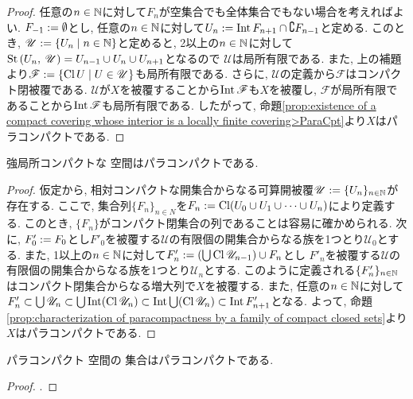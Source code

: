 \documentclass[uplatex, dvipdfmx, a4paper, 12pt, class=jsbook, crop=false]{standalone}
\begin{document}
\begin{proof}
	任意の$ n \in \mathbb{N} $に対して$ F_n $が空集合でも全体集合でもない場合を考えればよい.
	$ F_{-1} \mathrel{:=} \emptyset $とし, 任意の$ n \in \mathbb{N} $に対して$ U_n \mathrel{:=} \mathop{\mathrm{Int}}\nolimits F_{n+1} \cap \complement F_{n-1} $と定める.
	このとき, $ \mathscr{U} \defeq \setcomp{U_n}{n \in \N} $と定めると,
	2以上の$ n \in \mathbb{N} $に対して$ \mathrm{St}\left(U_n , \: \mathscr{U}\right) = U_{n-1} \cup U_n \cup U_{n+1} $となるので
	$ \mathscr{U} $は局所有限である. また, 上の補題より$ \mathscr{F} \defeq \setcomp{\topcl U}{U \in \mathscr{U}} $も局所有限である.
	さらに, $ \mathscr{U} $の定義から$ \mathscr{F} $はコンパクト閉被覆である.
	$ \mathscr{U} $が$ X $を被覆することから$ \mathop{\mathrm{Int}}\nolimits \mathscr{F} $も$ X $を被覆し,
	$ \mathscr{F} $が局所有限であることから$ \mathop{\mathrm{Int}}\nolimits \mathscr{F} $も局所有限である.
	したがって, 命題\ref{prop:existence of a compact covering whose interior is a locally finite covering>ParaCpt}より$ X $はパラコンパクトである.
\end{proof}

\begin{proposition}
	強局所コンパクトな \Lindelof 空間はパラコンパクトである.
\end{proposition}

\begin{proof}
	仮定から, 相対コンパクトな開集合からなる可算開被覆$ \mathscr{U} \mathrel{:=} \{U_n\}_{n \in \mathbb{N}} $が存在する.
	ここで, 集合列$ \{F_n\}_{n \in N} $を$ F_n \mathrel{:=} \mathop{\mathrm{Cl}}\nolimits (U_0 \cup U_1 \cup \cdots \cup U_n) $により定義する.
	このとき, $ \{F_n\} $がコンパクト閉集合の列であることは容易に確かめられる.
	次に, $ F'_0 \mathrel{:=} F_0 $とし$ F'_0 $を被覆する$ \mathscr{U} $の有限個の開集合からなる族を1つとり$ \mathscr{U}_0 $とする.
	また, 1以上の$ n \in \mathbb{N} $に対して$ F'_n \mathrel{:=} \left(\bigcup \mathop{\mathrm{Cl}}\nolimits \mathscr{U}_{n-1} \right) \cup F_n $とし
	$ F'_n $を被覆する$ \mathscr{U} $の有限個の開集合からなる族を1つとり$ \mathscr{U}_n $とする.
	このように定義される$ \{F'_n\}_{n \in \mathbb{N}} $はコンパクト閉集合からなる増大列で$ X $を被覆する.
	また, 任意の$ n \in \mathbb{N} $に対して$ F'_n \subset \bigcup \mathscr{U}_n  \subset \bigcup \mathop{\mathrm{Int}}\nolimits (\mathop{\mathrm{Cl}}\nolimits \mathscr{U}_n)
	\subset \mathop{\mathrm{Int}}\nolimits \bigcup (\mathop{\mathrm{Cl}}\nolimits \mathscr{U}_n) \subset \mathop{\mathrm{Int}}\nolimits F'_{n+1} $となる.
	よって, 命題\ref{prop:characterization of paracompactness by a family of compact closed sets}より$ X $はパラコンパクトである.
\end{proof}

\begin{proposition}
	パラコンパクト \Hausdorff 空間の \Fsigma 集合はパラコンパクトである.
\end{proposition}
\begin{proof}
	\WIP.
\end{proof}
\end{document}

